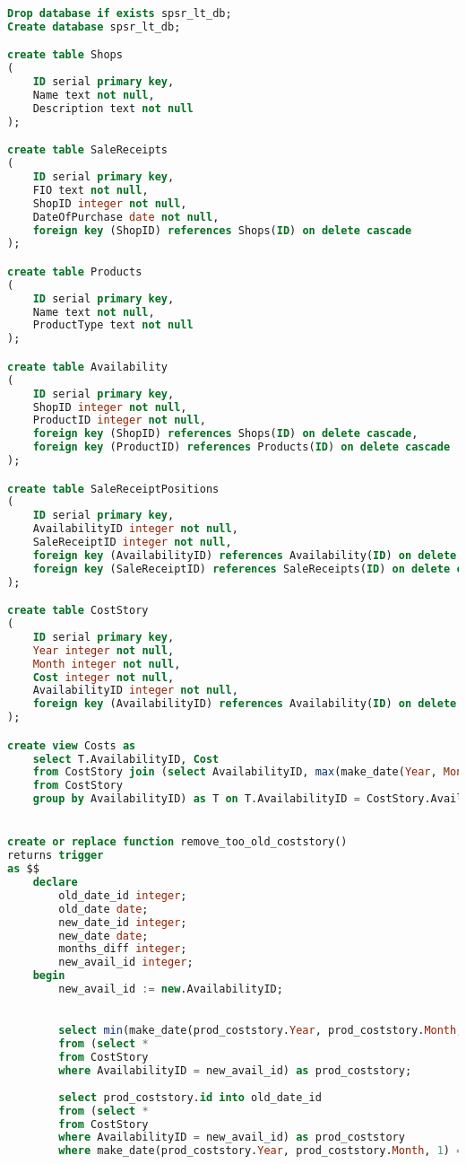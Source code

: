 \documentclass{bmstu}
\begin{document}
\begin{lstlisting}[language=sql, caption={Сценарий создания БД}]
Drop database if exists spsr_lt_db;
Create database spsr_lt_db;

create table Shops
(
	ID serial primary key,
	Name text not null,
	Description text not null
);

create table SaleReceipts
(
	ID serial primary key,
	FIO text not null,
	ShopID integer not null,
	DateOfPurchase date not null,
	foreign key (ShopID) references Shops(ID) on delete cascade
);

create table Products
(
	ID serial primary key,
	Name text not null,
	ProductType text not null
);

create table Availability
(
	ID serial primary key,
	ShopID integer not null,
	ProductID integer not null,
	foreign key (ShopID) references Shops(ID) on delete cascade,
	foreign key (ProductID) references Products(ID) on delete cascade
);

create table SaleReceiptPositions
(
	ID serial primary key,
	AvailabilityID integer not null,
	SaleReceiptID integer not null,
	foreign key (AvailabilityID) references Availability(ID) on delete cascade,
	foreign key (SaleReceiptID) references SaleReceipts(ID) on delete cascade
);

create table CostStory
(
	ID serial primary key,
	Year integer not null,
	Month integer not null,
	Cost integer not null,
	AvailabilityID integer not null,
	foreign key (AvailabilityID) references Availability(ID) on delete cascade
);

create view Costs as
	select T.AvailabilityID, Cost
	from CostStory join (select AvailabilityID, max(make_date(Year, Month, 1)) as CostDate
	from CostStory
	group by AvailabilityID) as T on T.AvailabilityID = CostStory.AvailabilityID and T.CostDate = make_date(CostStory.Year, CostStory.Month,1);


create or replace function remove_too_old_coststory()
returns trigger
as $$
	declare
		old_date_id integer;
		old_date date;
		new_date_id integer;
		new_date date;
		months_diff integer;
		new_avail_id integer;
	begin
		new_avail_id := new.AvailabilityID;
		

		select min(make_date(prod_coststory.Year, prod_coststory.Month, 1)) into old_date
		from (select * 
		from CostStory 
		where AvailabilityID = new_avail_id) as prod_coststory;
		
		select prod_coststory.id into old_date_id
		from (select * 
		from CostStory 
		where AvailabilityID = new_avail_id) as prod_coststory
		where make_date(prod_coststory.Year, prod_coststory.Month, 1) = old_date;
		


\end{lstlisting}
\end{document}
